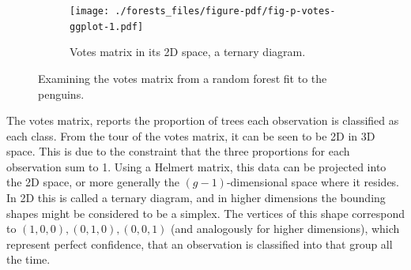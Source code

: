\documentclass[
  letterpaper,
]{book}
\newenvironment{Shaded}{\begin{snugshade}}{\end{snugshade}}
\newcommand{\AttributeTok}[1]{\textcolor[rgb]{0.40,0.45,0.13}{#1}}
\newcommand{\CommentTok}[1]{\textcolor[rgb]{0.37,0.37,0.37}{#1}}
\newcommand{\ConstantTok}[1]{\textcolor[rgb]{0.56,0.35,0.01}{#1}}
\newcommand{\DecValTok}[1]{\textcolor[rgb]{0.68,0.00,0.00}{#1}}
\newcommand{\FloatTok}[1]{\textcolor[rgb]{0.68,0.00,0.00}{#1}}
\newcommand{\FunctionTok}[1]{\textcolor[rgb]{0.28,0.35,0.67}{#1}}
\newcommand{\NormalTok}[1]{\textcolor[rgb]{0.00,0.23,0.31}{#1}}
\newcommand{\SpecialCharTok}[1]{\textcolor[rgb]{0.37,0.37,0.37}{#1}}
\newcommand{\StringTok}[1]{\textcolor[rgb]{0.13,0.47,0.30}{#1}}
\begin{document}
\begin{Shaded}
\end{Shaded}

\begin{figure}

\begin{minipage}[t]{0.50\linewidth}

{\centering 

}

\end{minipage}%
%
\begin{minipage}[t]{0.50\linewidth}

{\centering 

\begin{figure}

{\centering \texttt{[image: ./forests\_files/figure-pdf/fig-p-votes-ggplot-1.pdf]}

}

\caption{Votes matrix in its 2D space, a ternary diagram.}

\end{figure}

}

\end{minipage}%

\caption{\label{fig-penguins-votes}Examining the votes matrix from a
random forest fit to the penguins.}

\end{figure}

The votes matrix, reports the proportion of trees each observation is
classified as each class. From the tour of the votes matrix, it can be
seen to be 2D in 3D space. This is due to the constraint that the three
proportions for each observation sum to 1. Using a Helmert matrix, this
data can be projected into the 2D space, or more generally the
\((g-1)\)-dimensional space where it resides. In 2D this is called a
ternary diagram, and in higher dimensions the bounding shapes might be
considered to be a simplex. The vertices of this shape correspond to
\((1,0,0), (0,1,0), (0,0,1)\) (and analogously for higher dimensions),
which represent perfect confidence, that an observation is classified
into that group all the time.
\end{document}
